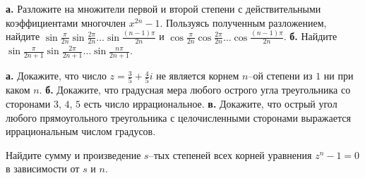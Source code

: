 \documentclass[a4paper, 12pt, num=22]{listok}
\begin{document}
\begin{problem}
	\textbf{а.} Разложите на множители первой и второй степени с действительными коэффициентами многочлен $x^{2n} - 1$.
	Пользуясь полученным разложением, найдите $\sin{\frac{\pi}{2n}}\sin{\frac{2\pi}{2n}}\ldots\sin{\frac{(n - 1)\pi}{2n}}$ и
	$\cos{\frac{\pi}{2n}}\cos{\frac{2\pi}{2n}}\ldots\cos{\frac{(n - 1)\pi}{2n}}$.
	\textbf{б.} Найдите $\sin{\frac{\pi}{2n + 1}}\sin{\frac{2\pi}{2n + 1}}\ldots\sin{\frac{n\pi}{2n + 1}}$.
\end{problem}
\begin{problem}
	\textbf{а.} Докажите, что число $z = \frac35 + \frac45 i$ не является корнем $n$--ой степени из $1$ ни при каком $n$.
	\textbf{б.} Докажите, что градусная мера любого острого угла треугольника со сторонами $3$, $4$, $5$ есть число иррациональное.
	\textbf{в.} Докажите, что острый угол любого прямоугольного треугольника с целочисленными сторонами выражается иррациональным числом градусов.
\end{problem}
\begin{problem}
	Найдите сумму и произведение $s$--тых степеней всех корней уравнения $z^n -1 = 0$ в зависимости от $s$ и $n$.
\end{problem}
\end{document}
